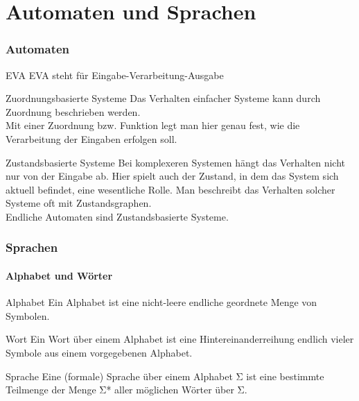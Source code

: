 \part{Automaten und Sprachen}

\section{Automaten}
\begin{zitat}{EVA}
EVA steht für Eingabe-Verarbeitung-Ausgabe
\end{zitat}

\begin{zitat}{Zuordnungsbasierte Systeme}
Das Verhalten einfacher Systeme kann durch Zuordnung beschrieben werden.\\
Mit einer Zuordnung bzw. Funktion legt man hier genau fest, wie die Verarbeitung der Eingaben erfolgen soll.
\end{zitat}
\begin{zitat}{Zustandsbasierte Systeme}
 Bei komplexeren Systemen hängt das Verhalten nicht nur von der Eingabe ab. Hier spielt auch der Zustand, in dem das System sich aktuell befindet, eine wesentliche Rolle. Man beschreibt das Verhalten solcher Systeme oft mit Zustandsgraphen. \\
 Endliche Automaten sind Zustandsbasierte Systeme.
\end{zitat}

\section{Sprachen}
\subsection{Alphabet und Wörter}
\begin{zitat}{Alphabet}
Ein Alphabet ist eine nicht-leere endliche geordnete Menge von Symbolen.
\end{zitat}
\begin{zitat}{Wort}
Ein Wort über einem Alphabet ist eine Hintereinanderreihung endlich vieler Symbole aus einem vorgegebenen Alphabet.
\end{zitat}
\begin{zitat}{Sprache}
Eine (formale) Sprache über einem Alphabet Σ ist eine bestimmte Teilmenge der Menge Σ* aller möglichen Wörter über Σ.
\end{zitat}

